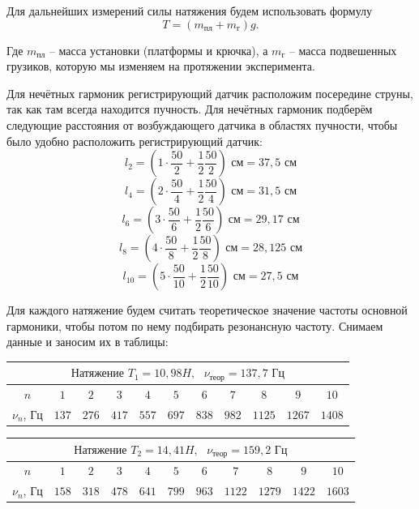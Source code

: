 \documentclass[a4paper, 12pt]{article} %
\begin{document}
Для дальнейших измерений силы натяжения будем использовать формулу \[ T = (m_{\text{пл}} + m_{\text{г}})g.\]

Где $m_{\text{пл}}$ -- масса установки (платформы и крючка), а $m_{\text{г}}$ -- масса подвешенных грузиков, которую мы изменяем на протяжении эксперимента.

Для нечётных гармоник регистрирующий датчик расположим посередине струны, так как там всегда находится пучность. Для нечётных гармоник подберём следующие расстояния от возбуждающего датчика в областях пучности, чтобы было удобно расположить регистрирующий датчик:
\[l_2 = (1\cdot\frac{50}{2} +  \frac{1}{2}\frac{50}{2})\text{ см} = 37,5\text{ см}\] 
\[l_4 = (2\cdot\frac{50}{4} +  \frac{1}{2}\frac{50}{4})\text{ см} = 31,5\text{ см}\] 
\[l_6 = (3\cdot\frac{50}{6} +  \frac{1}{2}\frac{50}{6})\text{ см} = 29,17\text{ см}\] 
\[l_8 = (4\cdot\frac{50}{8} +  \frac{1}{2}\frac{50}{8})\text{ см} = 28,125\text{ см}\] 
\[l_{10} = (5\cdot\frac{50}{10} +  \frac{1}{2}\frac{50}{10})\text{ см} = 27,5\text{ см}\] 

Для каждого натяжение будем считать теоретическое значение частоты основной гармоники, чтобы потом по нему подбирать резонансную частоту. Снимаем данные и заносим их в таблицы:

\begin{center}
\begin{tabular}{|c|c|c|c|c|c|c|c|c|c|c|}
\hline 
\multicolumn{11}{|c|}{$\textbf{Натяжение } T_1 = 10,98H, \text{ } \nu_{\text{теор}} = 137,7 \text{ Гц}$} \\ 
\hline 
$n$ & $1$ & $2$ & $3$ & $4$ & $5$ & $6$ & $7$ & $8$ & $9$ & $10$ \\ 
\hline 
$\nu_n$, Гц & $137$ & $276$ & $417$ & $557$ & $697$ & $838$ & $982$ & $1125$ & $1267$& $1408$\\
\hline
\end{tabular} 
\end{center}

\begin{center}
\begin{tabular}{|c|c|c|c|c|c|c|c|c|c|c|}
\hline 
\multicolumn{11}{|c|}{$\textbf{Натяжение } T_2 = 14,41H, \text{ } \nu_{\text{теор}} = 159,2 \text{ Гц}$} \\ 
\hline 
$n$ & $1$ & $2$ & $3$ & $4$ & $5$ & $6$ & $7$ & $8$ & $9$ & $10$ \\ 
\hline 
$\nu_n$, Гц & $158$ & $318$ & $478$ & $641$ & $799$ & $963$ & $1122$ & $1279$ & $1422$& $1603$\\
\hline
\end{tabular} 
\end{center}
\end{document}
